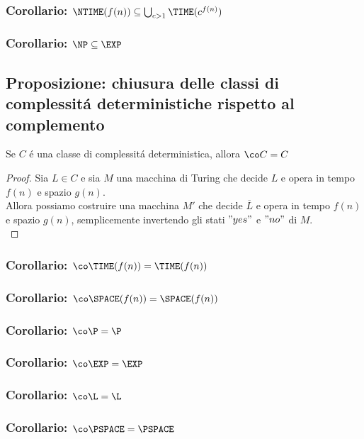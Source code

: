 \subsubsection{Corollario: $\NTIME(f(n)) \subseteq \bigcup_{c>1} \TIME(c^{f(n)})$}
\subsubsection{Corollario: $\NP \subseteq \EXP$}


\subsection{Proposizione: chiusura delle classi di complessitá deterministiche rispetto al complemento}
Se $C$ é una classe di complessitá deterministica, allora $\co C = C$
\begin{proof}
Sia $L \in C$ e sia $M$ una macchina di Turing che decide $L$ e opera in tempo $f(n)$ e spazio $g(n)$. \\
Allora possiamo costruire una macchina $M'$ che decide $\overline{L}$ e opera in tempo $f(n)$ e spazio $g(n)$, semplicemente invertendo gli stati $"yes"$ e $"no"$  di $M$. \\
\end{proof}
\subsubsection{Corollario: $\co \TIME(f(n)) = \TIME(f(n))$}
\subsubsection{Corollario: $\co \SPACE(f(n)) = \SPACE(f(n))$}
\subsubsection{Corollario: $\co \P = \P$}
\subsubsection{Corollario: $\co \EXP = \EXP$}
\subsubsection{Corollario: $\co \L = \L$}
\subsubsection{Corollario: $\co \PSPACE = \PSPACE$}

